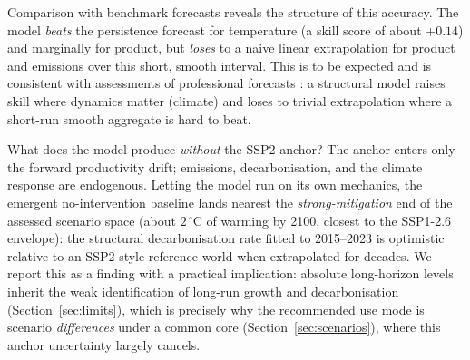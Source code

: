 \documentclass[a4paper,fleqn]{cas-sc}
\begin{document}
Comparison with benchmark forecasts reveals the structure of this accuracy. The model \emph{beats}
the persistence forecast for temperature (a skill score of about $+0.14$) and marginally for
product, but \emph{loses} to a naive linear extrapolation for product and emissions over this short,
smooth interval. This is to be expected and is consistent with assessments of professional forecasts
\citep{celasun2021}: a structural model raises skill where dynamics matter (climate) and loses to
trivial extrapolation where a short-run smooth aggregate is hard to beat.

What does the model produce \emph{without} the SSP2 anchor? The anchor enters only the forward
productivity drift; emissions, decarbonisation, and the climate response are endogenous. Letting
the model run on its own mechanics, the emergent no-intervention baseline lands nearest the
\emph{strong-mitigation} end of the assessed scenario space (about $2\,^\circ$C of warming by
2100, closest to the SSP1-2.6 envelope): the structural decarbonisation rate fitted to 2015--2023
is optimistic relative to an SSP2-style reference world when extrapolated for decades. We report
this as a finding with a practical implication: absolute long-horizon levels inherit the weak
identification of long-run growth and decarbonisation (Section~\ref{sec:limits}), which is
precisely why the recommended use mode is scenario \emph{differences} under a common core
(Section~\ref{sec:scenarios}), where this anchor uncertainty largely cancels.
\end{document}
